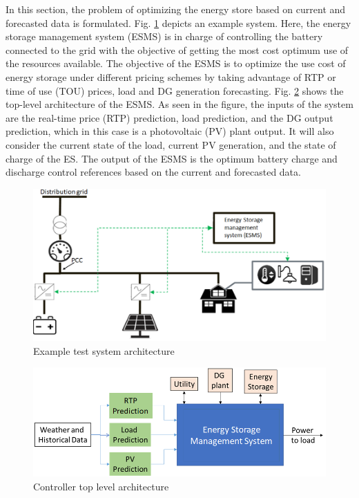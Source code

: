 In this section, the problem of optimizing the energy store based on current and forecasted data is formulated. Fig. \ref{fig:system_arch} depicts an example system. Here, the energy storage management system (ESMS) is in charge of controlling the battery connected to the grid with the objective of getting the most cost optimum use of the resources available. The objective of the ESMS is to optimize the use cost of energy storage under different pricing schemes by taking advantage of RTP or time of use (TOU) prices, load and DG generation forecasting.  Fig. \ref{fig:F1_CA} shows the top-level architecture of the ESMS. As seen in the figure, the inputs of the system are the real-time price (RTP) prediction, load prediction, and the DG output prediction, which in this case is a photovoltaic (PV) plant output. It will also consider the current state of the load, current PV generation, and the state of charge of the ES. The output of the ESMS is the optimum battery charge and discharge control references based on the current and forecasted data.

\begin{figure}[!htbp]
\centering
\includegraphics[width=0.6\linewidth]{figs/A8/System_architecture.png}
\caption{Example test system architecture}
\label{fig:system_arch}
\vspace{-3mm}
\end{figure}


\begin{figure}[!ht]
    \centering
    \includegraphics[width = 0.8\linewidth]{figs/A8/EMS_FIG.png}
    \caption{Controller top level architecture}
    \label{fig:F1_CA}
\end{figure}

